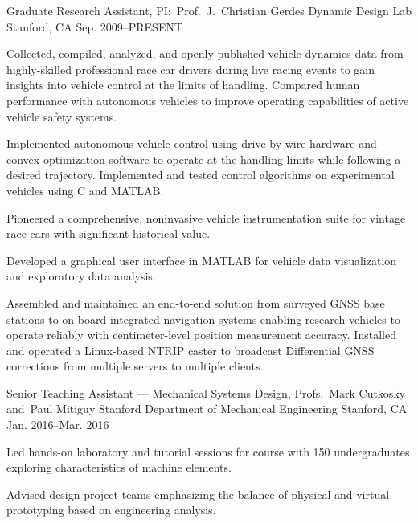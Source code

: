 \begin{cventries}
  \cventry%
    {Graduate Research Assistant, PI:\ Prof.~J.~Christian Gerdes}
    {Dynamic Design Lab}
    {Stanford, CA}
    {Sep. 2009--PRESENT}
    {
      \begin{cvitems}
        \item{Collected, compiled, analyzed, and openly published vehicle dynamics data from highly-skilled professional race car drivers during live racing events to gain insights into vehicle control at the limits of handling. Compared human performance with autonomous vehicles to improve operating capabilities of active vehicle safety systems.}
        \item {Implemented autonomous vehicle control using drive-by-wire hardware and convex optimization software to operate at the handling limits while following a desired trajectory. Implemented and tested control algorithms on experimental vehicles using C and MATLAB.}
        \item {Pioneered a comprehensive, noninvasive vehicle instrumentation suite for vintage race cars with significant historical value.}
        \item {Developed a graphical user interface in MATLAB for vehicle data visualization and exploratory data analysis.}
        \item {Assembled and maintained an end-to-end solution from surveyed GNSS base stations to on-board integrated navigation systems enabling research vehicles to operate reliably with centimeter-level position measurement accuracy. Installed and operated a Linux-based NTRIP caster to broadcast Differential GNSS corrections from multiple servers to multiple clients.}
      \end{cvitems}
    }

  \cventry%
    {Senior Teaching Assistant --- Mechanical Systems Design, Profs.~Mark Cutkosky and~Paul Mitiguy}
    {Stanford Department of Mechanical Engineering}
    {Stanford, CA}
    {Jan. 2016--Mar. 2016}
    {
      \begin{cvitems}
        \item {Led hands-on laboratory and tutorial sessions for course with 150 undergraduates exploring characteristics of machine elements.}
        \item {Advised design-project teams emphasizing the balance of physical and virtual prototyping based on engineering analysis.}
      \end{cvitems}
    }


\end{cventries}
